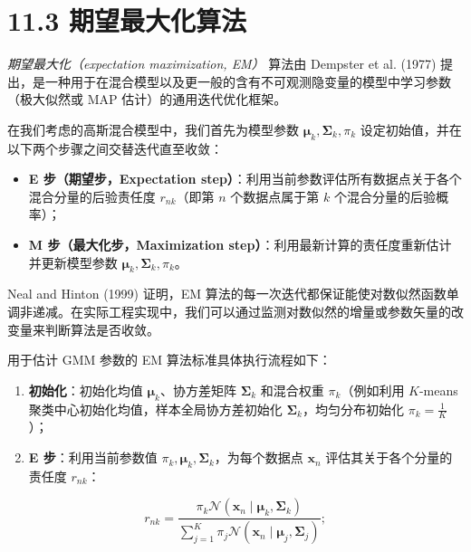 \section*{11.3 期望最大化算法}
\label{sec:11.3}

\emph{期望最大化（expectation maximization, EM）} 算法由 Dempster et al. (1977) 提出，是一种用于在混合模型以及更一般的含有不可观测隐变量的模型中学习参数（极大似然或 MAP 估计）的通用迭代优化框架。

在我们考虑的高斯混合模型中，我们首先为模型参数 $ \boldsymbol{\mu}_k, \boldsymbol{\Sigma}_k, \pi_k $ 设定初始值，并在以下两个步骤之间交替迭代直至收敛：

\begin{itemize}
\item \textbf{E 步（期望步，Expectation step）}：利用当前参数评估所有数据点关于各个混合分量的后验责任度 $ r_{nk} $（即第 $ n $ 个数据点属于第 $ k $ 个混合分量的后验概率）；
\item \textbf{M 步（最大化步，Maximization step）}：利用最新计算的责任度重新估计并更新模型参数 $ \boldsymbol{\mu}_k, \boldsymbol{\Sigma}_k, \pi_k $。
\end{itemize}

Neal and Hinton (1999) 证明，EM 算法的每一次迭代都保证能使对数似然函数单调非递减。在实际工程实现中，我们可以通过监测对数似然的增量或参数矢量的改变量来判断算法是否收敛。

用于估计 GMM 参数的 EM 算法标准具体执行流程如下：

\begin{enumerate}
\item \textbf{初始化}：初始化均值 $ \boldsymbol{\mu}_k $、协方差矩阵 $ \boldsymbol{\Sigma}_k $ 和混合权重 $ \pi_k $（例如利用 $ K $-means 聚类中心初始化均值，样本全局协方差初始化 $ \boldsymbol{\Sigma}_k $，均匀分布初始化 $ \pi_k = \frac{1}{K} $）；
\item \textbf{E 步}：利用当前参数值 $ \pi_k, \boldsymbol{\mu}_k, \boldsymbol{\Sigma}_k $，为每个数据点 $ \boldsymbol{x}_n $ 评估其关于各个分量的责任度 $ r_{nk} $：
\end{enumerate}

\begin{equation}
r_{nk} = \frac{\pi_k \mathcal{N}\left(\boldsymbol{x}_n \mid \boldsymbol{\mu}_k, \boldsymbol{\Sigma}_k\right)}{\sum_{j=1}^K \pi_j \mathcal{N}\left(\boldsymbol{x}_n \mid \boldsymbol{\mu}_j, \boldsymbol{\Sigma}_j\right)} ;
\tag{11.53}
\end{equation}

